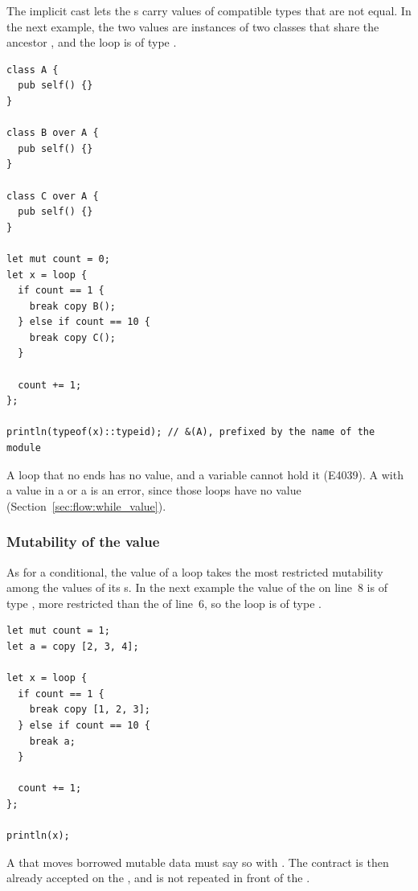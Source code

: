 

The implicit cast lets the s carry values of compatible types that
are not equal. In the next example, the two values are instances of two
classes that share the ancestor , and the loop is of type .

\begin{lstlisting}[style=coloredverbatim, escapechar=@]
class A {
  pub self() {}
}

class B over A {
  pub self() {}
}

class C over A {
  pub self() {}
}

let mut count = 0;
let x = loop {
  if count == 1 {
    break copy B();
  } else if count == 10 {
    break copy C();
  }

  count += 1;
};

println(typeof(x)::typeid); // &(A), prefixed by the name of the module
\end{lstlisting}

A loop that no  ends has no value, and a variable cannot hold it
(E4039). A  with a value in a  or a  is an
error, since those loops have no value (Section~\ref{sec:flow:while_value}).

\subsubsection{Mutability of the value}

As for a conditional, the value of a loop takes the most restricted mutability
among the values of its s. In the next example the value of the
 on line~8 is of type , more restricted than the
 of line~6, so the loop is of type .

\begin{lstlisting}[style=coloredverbatim, escapechar=@]
let mut count = 1;
let a = copy [2, 3, 4];

let x = loop {
  if count == 1 {
    break copy [1, 2, 3];
  } else if count == 10 {
    break a;
  }

  count += 1;
};

println(x);
\end{lstlisting}

A  that moves borrowed mutable data must say so with .
The contract is then already accepted on the , and is not repeated
in front of the .

